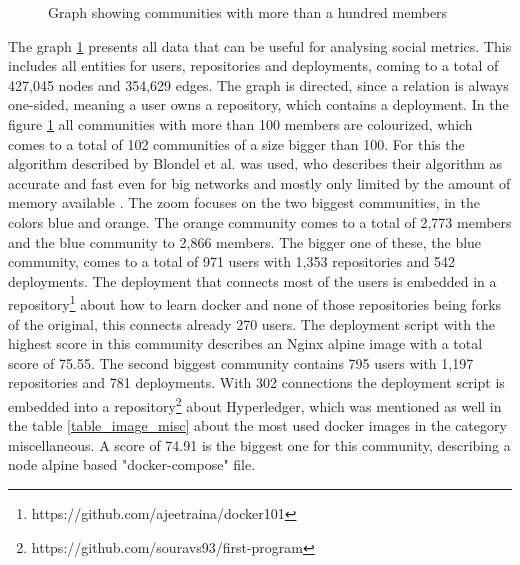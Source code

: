 \begin{figure}[]\centering
{}
    \caption{Graph showing communities with more than a hundred members}
    \label{fig:graph_communities}
\end{figure}

The graph \ref{fig:graph_communities} presents all data that can be useful for analysing social metrics. This includes all entities for users, repositories and deployments, coming to a total of 427,045 nodes and 354,629 edges. The graph is directed, since a relation is always one-sided, meaning a user owns a repository, which contains a deployment. In the figure \ref{fig:graph_communities} all communities with more than 100 members are colourized, which comes to a total of 102 communities of a size bigger than 100. For this the algorithm described by Blondel et al. was used, who describes their algorithm as accurate and fast even for big networks and mostly only limited by the amount of memory available \cite{Blondel_2008}. The zoom focuses on the two biggest communities, in the colors blue and orange. The orange community comes to a total of 2,773 members and the blue community to 2,866 members. The bigger one of these, the blue community, comes to a total of 971 users with 1,353 repositories and 542 deployments. The deployment that connects most of the users is embedded in a repository\footnote{https://github.com/ajeetraina/docker101} about how to learn docker and none of those repositories being forks of the original, this connects already 270 users. The deployment script with the highest score in this community describes an Nginx alpine image with a total score of 75.55.
The second biggest community contains 795 users with 1,197 repositories and 781 deployments. With 302 connections the deployment script is embedded into a repository\footnote{https://github.com/souravs93/first-program} about Hyperledger, which was mentioned as well in the table \ref{table_image_misc} about the most used docker images in the category miscellaneous. A score of 74.91 is the biggest one for this community, describing a node alpine based "docker-compose" file.

